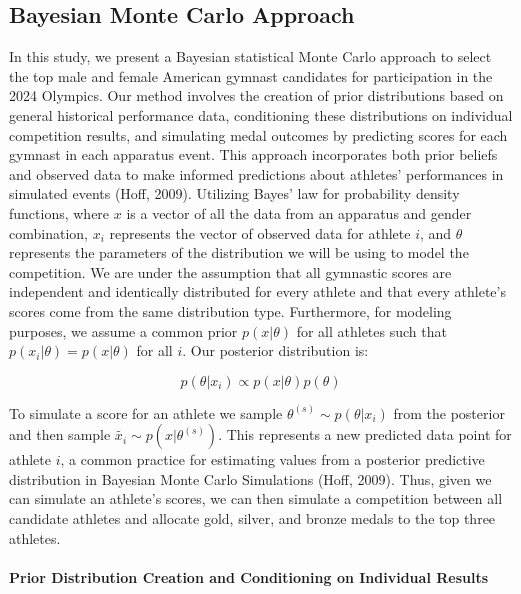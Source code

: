 \documentclass[
  10.5pt,
  letterpaper,
  DIV=11,
  numbers=noendperiod]{scrartcl}
\let\oldparagraph\paragraph
\renewcommand{\paragraph}[1]{\oldparagraph{#1}\mbox{}}
\begin{document}
\hypertarget{bayesian-monte-carlo-approach}{%
\subsection{Bayesian Monte Carlo
Approach}\label{bayesian-monte-carlo-approach}}

In this study, we present a Bayesian statistical Monte Carlo approach to
select the top male and female American gymnast candidates for
participation in the 2024 Olympics. Our method involves the creation of
prior distributions based on general historical performance data,
conditioning these distributions on individual competition results, and
simulating medal outcomes by predicting scores for each gymnast in each
apparatus event. This approach incorporates both prior beliefs and
observed data to make informed predictions about athletes' performances
in simulated events (Hoff, 2009). Utilizing Bayes' law for probability
density functions, where \(x\) is a vector of all the data from an
apparatus and gender combination, \(x_i\) represents the vector of
observed data for athlete \(i\), and \(\theta\) represents the
parameters of the distribution we will be using to model the
competition. We are under the assumption that all gymnastic scores are
independent and identically distributed for every athlete and that every
athlete's scores come from the same distribution type. Furthermore, for
modeling purposes, we assume a common prior \(p(x| \theta)\) for all
athletes such that \(p(x_i | \theta) = p(x| \theta)\) for all \(i\). Our
posterior distribution is:

\[
p(\theta |x_i) \propto p(x| \theta) p(\theta)
\]

To simulate a score for an athlete we sample
\(\theta^{(s)} \sim p(\theta | x_i)\) from the posterior and then sample
\(\tilde{x_i} \sim p(x| \theta^{(s)})\). This represents a new predicted
data point for athlete \(i\), a common practice for estimating values
from a posterior predictive distribution in Bayesian Monte Carlo
Simulations (Hoff, 2009). Thus, given we can simulate an athlete's
scores, we can then simulate a competition between all candidate
athletes and allocate gold, silver, and bronze medals to the top three
athletes.

\hypertarget{prior-distribution-creation-and-conditioning-on-individual-results}{%
\paragraph{Prior Distribution Creation and Conditioning on Individual
Results}\label{prior-distribution-creation-and-conditioning-on-individual-results}}
\end{document}
